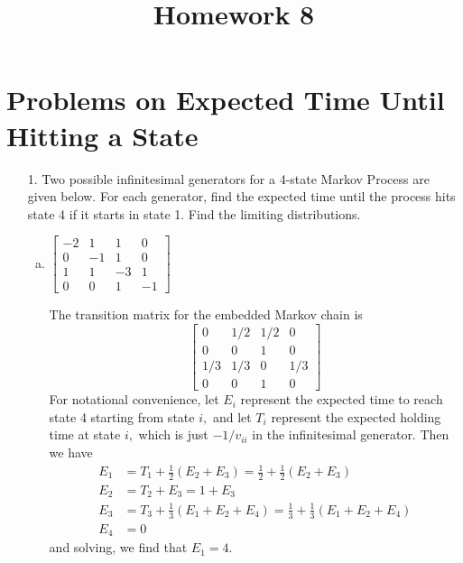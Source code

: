 \documentclass{article}
\begin{document}
\title{Homework 8}
\maketitle
\thispagestyle{fancy}

\section*{Problems on Expected Time Until Hitting a State}

\begin{itemize}
	\item[1.] Two possible infinitesimal generators for a 4-state Markov Process are given below. For each generator, find the expected time until the process hits state 4 if it starts in state 1. Find the limiting distributions.
		\begin{enumerate}[(a)]
			\item $\begin{bmatrix}
					-2 & 1 & 1 & 0 \\ 
					0 & -1 & 1 & 0 \\
					1 & 1 & -3 & 1 \\
					0 & 0 & 1 & -1
				\end{bmatrix}$
				\begin{soln}
					The transition matrix for the embedded Markov chain is
					\[\begin{bmatrix}
							0 & 1/2 & 1/2 & 0 \\
							0 & 0 & 1 & 0 \\
							1/3 & 1/3 & 0 & 1/3 \\
							0 & 0 & 1 & 0
					\end{bmatrix}\]
					For notational convenience, let $E_i$ represent the expected time to reach state 4 starting from state $i,$ and let $T_i$ represent the expected holding time at state $i,$ which is just $-1/v_{ii}$ in the infinitesimal generator. Then we have
					\begin{align*}
						E_1 &= T_1 + \frac{1}{2} \left( E_2 + E_3 \right) = \frac{1}{2} + \frac{1}{2} \left( E_2 + E_3 \right) \\
						E_2 &= T_2 + E_3 = 1+E_3 \\
						E_3 &= T_3 + \frac{1}{3}\left( E_1+E_2 + E_4 \right) = \frac{1}{3} + \frac{1}{3} \left( E_1+E_2+E_4 \right) \\
						E_4 &= 0
					\end{align*}
					and solving, we find that $E_1=4.$


\end{soln}
\end{enumerate}
\end{itemize}
\end{document}
